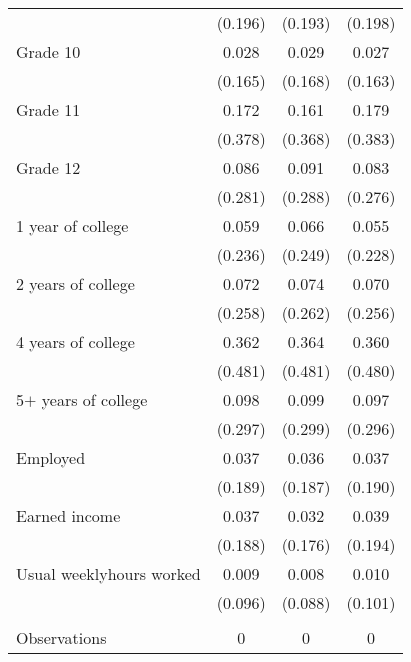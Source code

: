 \begin{tabular}{lccc}
 & (0.196) & (0.193) & (0.198) \\
 \hspace{0.3cm} Grade 10  & 0.028 & 0.029 & 0.027 \\
 & (0.165) & (0.168) & (0.163) \\
 \hspace{0.3cm} Grade 11  & 0.172 & 0.161 & 0.179 \\
 & (0.378) & (0.368) & (0.383) \\
 \hspace{0.3cm} Grade 12  & 0.086 & 0.091 & 0.083 \\
 & (0.281) & (0.288) & (0.276) \\
 \hspace{0.3cm} 1 year of college  & 0.059 & 0.066 & 0.055 \\
 & (0.236) & (0.249) & (0.228) \\
 \hspace{0.3cm} 2 years of college  & 0.072 & 0.074 & 0.070 \\
 & (0.258) & (0.262) & (0.256) \\
 \hspace{0.3cm} 4 years of college  & 0.362 & 0.364 & 0.360 \\
 & (0.481) & (0.481) & (0.480) \\
 \hspace{0.3cm} 5$+$ years of college  & 0.098 & 0.099 & 0.097 \\
 & (0.297) & (0.299) & (0.296) \\
 Employed  & 0.037 & 0.036 & 0.037 \\
 & (0.189) & (0.187) & (0.190) \\
 Earned income  & 0.037 & 0.032 & 0.039 \\
 & (0.188) & (0.176) & (0.194) \\
 Usual weeklyhours worked  & 0.009 & 0.008 & 0.010 \\
 & (0.096) & (0.088) & (0.101) \\
\\
Observations & 0 & 0 & 0 \\
\bottomrule
\bottomrule
\end{tabular}